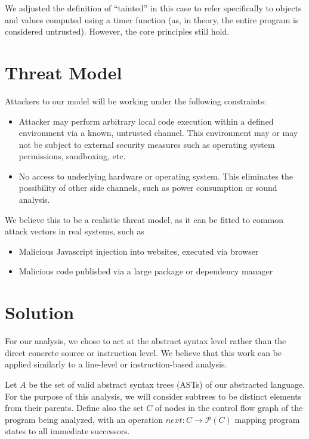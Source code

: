 \documentclass[12pt]{article}
\begin{document}
\begin{multicols*}{2}
  We adjusted the definition of ``tainted'' in this case to refer specifically
  to objects and values computed using a timer function (as, in theory, the
  entire program is considered untrusted). However, the core principles still
  hold.

  \section{Threat Model}

  Attackers to our model will be working under the following constraints:

  \begin{itemize}
    \item Attacker may perform arbitrary local code execution within a defined
      environment via a known, untrusted channel. This environment may or may
      not be subject to external security measures such as operating system
      permissions, sandboxing, etc.
    \item No access to underlying hardware or operating system. This eliminates
      the possibility of other side channels, such as power consumption or
      sound analysis.
  \end{itemize}

  We believe this to be a realistic threat model, as it can be fitted to
  common attack vectors in real systems, such as

  \begin{itemize}
    \item Malicious Javascript injection into websites, executed via browser
    \item Malicious code published via a large package or dependency manager
  \end{itemize}

  \section{Solution}

  For our analysis, we chose to act at the abstract syntax level rather
  than the direct concrete source or instruction level. We believe that this
  work can be applied similarly to a line-level or instruction-based analysis.

  Let $A$ be the set of valid abstract syntax trees (ASTs) of our abstracted
  language. For the purpose of this analysis, we will consider subtrees to be
  distinct elements from their parents. Define also the set $C$ of nodes in
  the control flow graph of the program being analyzed, with an operation
  $next: C \rightarrow \mathcal{P}(C)$ mapping program states to all immediate
  successors.


\end{multicols*}
\end{document}
